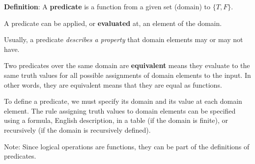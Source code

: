 
{\bf  Definition}: A  {\bf predicate}  is  a function from a given set (domain) to $\{T,F\}$.

A predicate can be applied, or {\bf evaluated} at, an element of the domain.

Usually, a predicate {\it describes a  property} that domain elements may or may not have.

Two predicates over the same domain are {\bf equivalent} means they evaluate to
the same truth values for all possible assignments of domain elements to the
input. In other words, they are equivalent means that they are equal as functions.

To define a predicate, we must specify its domain and its value at each domain element.
The rule assigning truth values to domain elements can be specified using a formula, 
English description, in a table (if the domain is finite), or recursively (if the domain is recursively
defined).

Note: Since logical operations are functions, they can be part of the definitions of predicates.